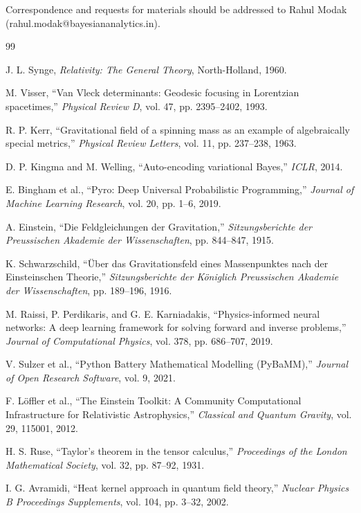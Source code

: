 \documentclass[11pt,a4paper]{article}
\begin{document}
Correspondence and requests for materials should be addressed to Rahul Modak (rahul.modak@bayesiananalytics.in).

\begin{thebibliography}{99}

J. L. Synge, \emph{Relativity: The General Theory}, North-Holland, 1960.

M. Visser, ``Van Vleck determinants: Geodesic focusing in Lorentzian spacetimes,'' \emph{Physical Review D}, vol. 47, pp. 2395--2402, 1993.

R. P. Kerr, ``Gravitational field of a spinning mass as an example of algebraically special metrics,'' \emph{Physical Review Letters}, vol. 11, pp. 237--238, 1963.

D. P. Kingma and M. Welling, ``Auto-encoding variational Bayes,'' \emph{ICLR}, 2014.

E. Bingham et al., ``Pyro: Deep Universal Probabilistic Programming,'' \emph{Journal of Machine Learning Research}, vol. 20, pp. 1--6, 2019.

A. Einstein, ``Die Feldgleichungen der Gravitation,'' \emph{Sitzungsberichte der Preussischen Akademie der Wissenschaften}, pp. 844--847, 1915.

K. Schwarzschild, ``Über das Gravitationsfeld eines Massenpunktes nach der Einsteinschen Theorie,'' \emph{Sitzungsberichte der Königlich Preussischen Akademie der Wissenschaften}, pp. 189--196, 1916.

M. Raissi, P. Perdikaris, and G. E. Karniadakis, ``Physics-informed neural networks: A deep learning framework for solving forward and inverse problems,'' \emph{Journal of Computational Physics}, vol. 378, pp. 686--707, 2019.

V. Sulzer et al., ``Python Battery Mathematical Modelling (PyBaMM),'' \emph{Journal of Open Research Software}, vol. 9, 2021.

F. Löffler et al., ``The Einstein Toolkit: A Community Computational Infrastructure for Relativistic Astrophysics,'' \emph{Classical and Quantum Gravity}, vol. 29, 115001, 2012.

H. S. Ruse, ``Taylor's theorem in the tensor calculus,'' \emph{Proceedings of the London Mathematical Society}, vol. 32, pp. 87--92, 1931.

I. G. Avramidi, ``Heat kernel approach in quantum field theory,'' \emph{Nuclear Physics B Proceedings Supplements}, vol. 104, pp. 3--32, 2002.

\end{thebibliography}
\end{document}
